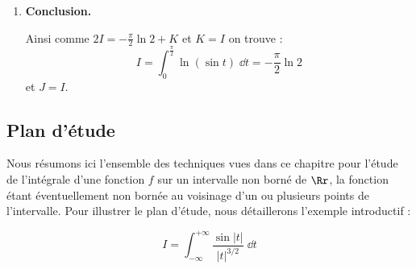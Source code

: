 \documentclass[class=report,crop=false]{standalone}
\begin{document}
\begin{exemple}
\begin{enumerate}
 \item \textbf{Conclusion.}
 
 Ainsi comme $2I = -\frac\pi2\ln 2 + K$ et $K=I$ on trouve :
 $$I = \int_0^{\frac\pi2} \ln(\sin t) \;\dd t= -\frac\pi2\ln 2$$
 et $J=I$.
  
  
\end{enumerate}


\end{exemple}


\subsection{Plan d'étude}
%
Nous résumons ici l'ensemble des techniques vues dans ce chapitre
pour l'étude de l'intégrale d'une fonction $f$ sur un intervalle
non borné de $\Rr$, la fonction étant éventuellement non
bornée au voisinage d'un ou plusieurs points de l'intervalle. Pour
illustrer le plan d'étude, nous détaillerons l'exemple introductif :

\begin{minipage}{0.39\textwidth}
$$I = \int_{-\infty}^{+\infty} \frac{\sin |t|}{|t|^{3/2}}\;\dd t$$  
\end{minipage}
\begin{minipage}{0.59\textwidth}
\end{minipage}
\end{document}
